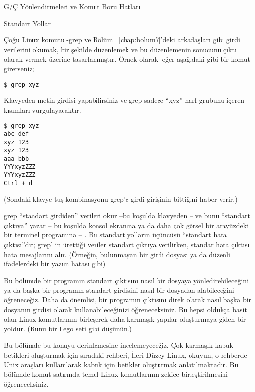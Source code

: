 \begin{section}{G/Ç Yönlendirmeleri ve Komut Boru Hatları}
\begin{subsection}{Standart Yollar}

Çoğu Linux komutu -grep ve Bölüm ~\ref{chap:bolum7}'deki arkadaşları gibi girdi verilerini okumak, bir şekilde düzenlemek ve bu düzenlemenin sonucunu çıktı olarak vermek üzerine tasarlanmıştır. Örnek olarak, eğer aşağıdaki gibi bir komut girerseniz;

\begin{verbatim}
$ grep xyz
\end{verbatim}

Klavyeden metin girdisi yapabilirsiniz ve grep sadece “xyz” harf grubunu içeren kısımları vurgulayacaktır.

\begin{verbatim}
$ grep xyz 
abc def 
xyz 123 
xyz 123 
aaa bbb 
YYYxyzZZZ 
YYYxyzZZZ 
Ctrl + d
\end{verbatim}

(Sondaki klavye tuş kombinasyonu grep'e girdi girişinin bittiğini haber verir.)

grep “standart girdiden” verileri okur –bu koşulda klavyeden – ve bunu “standart çıktıya” yazar – bu koşulda konsol ekranına ya da daha çok görsel bir arayüzdeki bir terminel programına – . Bu standart yolların üçüncüsü “standart hata çıktısı”dır; grep' in ürettiği veriler standart çıktıya verilirken, standar hata çıktısı hata mesajlarını alır. (Örneğin, bulunmayan bir girdi dosyası ya da düzenli ifadelerdeki bir yazım hatası gibi)

Bu bölümde bir programın standart çıktısını nasıl bir dosyaya yönledirebileceğini ya da başka bir programın standart girdisini nasıl bir dosyadan alabileceğini öğreneceğiz. Daha da önemlisi, bir programın çıktısını direk olarak nasıl başka bir dosyanın girdisi olarak kullanabileceğinizi öğreneceksiniz.  Bu hepsi oldukça basit olan Linux komutlarının birleşerek daha karmaşık yapılar oluşturmaya giden bir yoldur. (Bunu bir Lego seti gibi düşünün.)

Bu bölümde bu konuyu derinlemesine incelemeyeceğiz. Çok karmaşık kabuk betikleri oluşturmak için sıradaki rehberi, İleri Düzey Linux, okuyun, o rehberde Unix araçları kullanılarak kabuk için betikler oluşturmak anlatılmaktadır. Bu bölümde komut satırında temel Linux komutlarının zekice birleştirilmesini öğreneceksiniz. 


\end{subsection}
\end{section}
